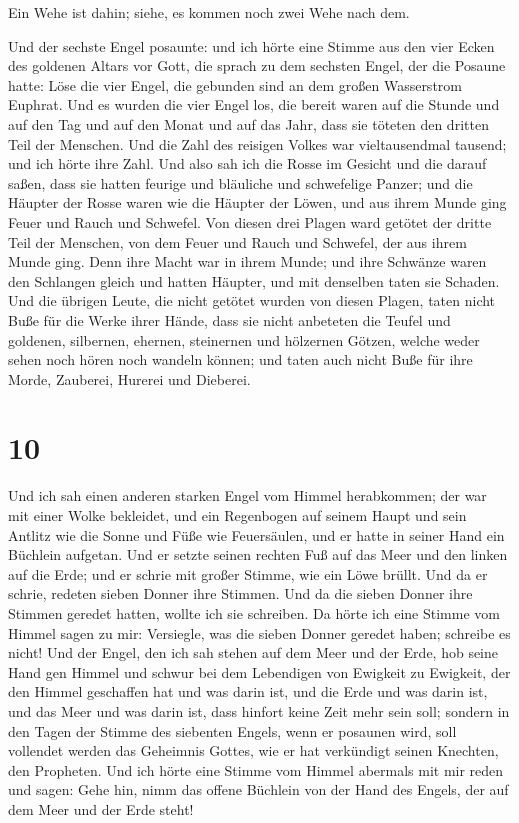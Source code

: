  Ein Wehe ist dahin; siehe, es kommen noch zwei Wehe nach
dem.

 Und der sechste Engel posaunte: und ich hörte eine
Stimme aus den vier Ecken des goldenen Altars vor Gott, 
die sprach zu dem sechsten Engel, der die Posaune hatte: Löse die vier
Engel, die gebunden sind an dem großen Wasserstrom Euphrat.
 Und es wurden die vier Engel los, die bereit waren auf
die Stunde und auf den Tag und auf den Monat und auf das Jahr, dass sie
töteten den dritten Teil der Menschen.  Und die Zahl des
reisigen Volkes war vieltausendmal tausend; und ich hörte ihre Zahl.
 Und also sah ich die Rosse im Gesicht und die darauf
saßen, dass sie hatten feurige und bläuliche und schwefelige Panzer; und
die Häupter der Rosse waren wie die Häupter der Löwen, und aus ihrem
Munde ging Feuer und Rauch und Schwefel.  Von diesen drei
Plagen ward getötet der dritte Teil der Menschen, von dem Feuer und
Rauch und Schwefel, der aus ihrem Munde ging.  Denn ihre
Macht war in ihrem Munde; und ihre Schwänze waren den Schlangen gleich
und hatten Häupter, und mit denselben taten sie Schaden. 
Und die übrigen Leute, die nicht getötet wurden von diesen Plagen, taten
nicht Buße für die Werke ihrer Hände, dass sie nicht anbeteten die
Teufel und goldenen, silbernen, ehernen, steinernen und hölzernen
Götzen, welche weder sehen noch hören noch wandeln können;
 und taten auch nicht Buße für ihre Morde, Zauberei,
Hurerei und Dieberei.

\hypertarget{section-9}{%
\section{10}\label{section-9}}

 Und ich sah einen anderen starken Engel vom Himmel
herabkommen; der war mit einer Wolke bekleidet, und ein Regenbogen auf
seinem Haupt und sein Antlitz wie die Sonne und Füße wie Feuersäulen,
 und er hatte in seiner Hand ein Büchlein aufgetan. Und er
setzte seinen rechten Fuß auf das Meer und den linken auf die Erde;
 und er schrie mit großer Stimme, wie ein Löwe brüllt. Und
da er schrie, redeten sieben Donner ihre Stimmen.  Und da
die sieben Donner ihre Stimmen geredet hatten, wollte ich sie schreiben.
Da hörte ich eine Stimme vom Himmel sagen zu mir: Versiegle, was die
sieben Donner geredet haben; schreibe es nicht!  Und der
Engel, den ich sah stehen auf dem Meer und der Erde, hob seine Hand gen
Himmel  und schwur bei dem Lebendigen von Ewigkeit zu
Ewigkeit, der den Himmel geschaffen hat und was darin ist, und die Erde
und was darin ist, und das Meer und was darin ist, dass hinfort keine
Zeit mehr sein soll;  sondern in den Tagen der Stimme des
siebenten Engels, wenn er posaunen wird, soll vollendet werden das
Geheimnis Gottes, wie er hat verkündigt seinen Knechten, den Propheten.
 Und ich hörte eine Stimme vom Himmel abermals mit mir
reden und sagen: Gehe hin, nimm das offene Büchlein von der Hand des
Engels, der auf dem Meer und der Erde steht!

